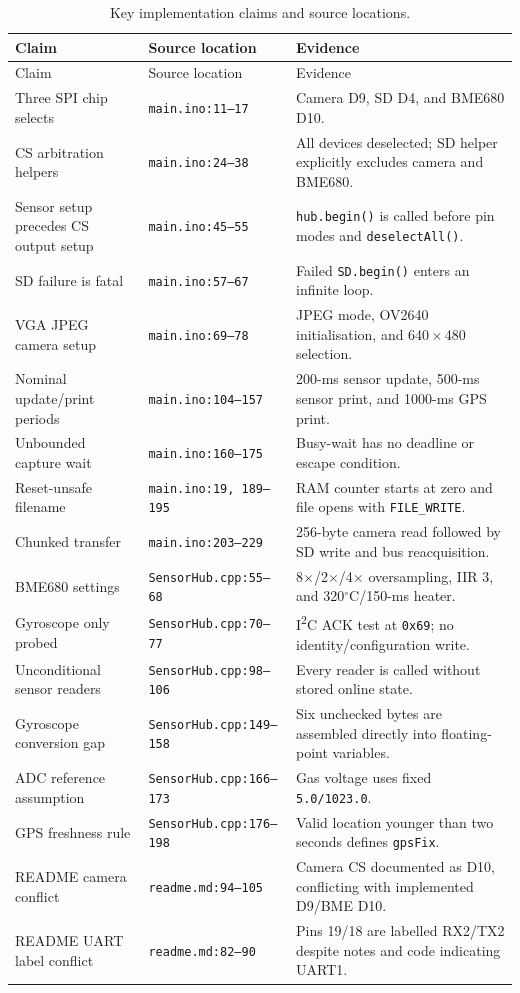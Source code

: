 \documentclass[11pt,a4paper]{article}
\newcommand{\code}[1]{\texttt{#1}}
\newcommand{\src}[2]{\texttt{\footnotesize #1:}\allowbreak\texttt{\footnotesize #2}}
\begin{document}
\small
\begin{longtable}{P{0.28\textwidth}P{0.24\textwidth}P{0.38\textwidth}}
\caption{Key implementation claims and source locations.}\label{tab:trace}\\
\toprule
Claim & Source location & Evidence\\
\midrule
\endfirsthead
\toprule
Claim & Source location & Evidence\\
\midrule
\endhead
Three SPI chip selects & \src{main.ino}{11--17} & Camera D9, SD D4, and BME680 D10.\\
CS arbitration helpers & \src{main.ino}{24--38} & All devices deselected; SD helper explicitly excludes camera and BME680.\\
Sensor setup precedes CS output setup & \src{main.ino}{45--55} & \code{hub.begin()} is called before pin modes and \code{deselectAll()}.\\
SD failure is fatal & \src{main.ino}{57--67} & Failed \code{SD.begin()} enters an infinite loop.\\
VGA JPEG camera setup & \src{main.ino}{69--78} & JPEG mode, OV2640 initialisation, and 640\,$\times$\,480 selection.\\
Nominal update/print periods & \src{main.ino}{104--157} & 200-ms sensor update, 500-ms sensor print, and 1000-ms GPS print.\\
Unbounded capture wait & \src{main.ino}{160--175} & Busy-wait has no deadline or escape condition.\\
Reset-unsafe filename & \src{main.ino}{19, 189--195} & RAM counter starts at zero and file opens with \code{FILE\_WRITE}.\\
Chunked transfer & \src{main.ino}{203--229} & 256-byte camera read followed by SD write and bus reacquisition.\\
BME680 settings & \src{SensorHub.cpp}{55--68} & 8$\times$/2$\times$/4$\times$ oversampling, IIR 3, and 320$^\circ$C/150-ms heater.\\
Gyroscope only probed & \src{SensorHub.cpp}{70--77} & I\textsuperscript{2}C ACK test at \code{0x69}; no identity/configuration write.\\
Unconditional sensor readers & \src{SensorHub.cpp}{98--106} & Every reader is called without stored online state.\\
Gyroscope conversion gap & \src{SensorHub.cpp}{149--158} & Six unchecked bytes are assembled directly into floating-point variables.\\
ADC reference assumption & \src{SensorHub.cpp}{166--173} & Gas voltage uses fixed \code{5.0/1023.0}.\\
GPS freshness rule & \src{SensorHub.cpp}{176--198} & Valid location younger than two seconds defines \code{gpsFix}.\\
README camera conflict & \src{readme.md}{94--105} & Camera CS documented as D10, conflicting with implemented D9/BME D10.\\
README UART label conflict & \src{readme.md}{82--90} & Pins 19/18 are labelled RX2/TX2 despite notes and code indicating UART1.\\
\bottomrule
\end{longtable}
\end{document}
